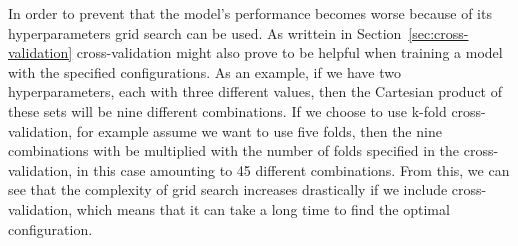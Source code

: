 In order to prevent that the model's performance becomes worse because of its hyperparameters grid search can be used. As writtein in Section~\ref{sec:cross-validation} cross-validation might also prove to be helpful when training a model with the specified configurations. As an example, if we have two hyperparameters, each with three different values, then the Cartesian product of these sets will be nine different combinations. If we choose to use k-fold cross-validation, for example assume we want to use five folds, then the nine combinations with be multiplied with the number of folds specified in the cross-validation, in this case amounting to 45 different combinations. From this, we can see that the complexity of grid search increases drastically if we include cross-validation, which means that it can take a long time to find the optimal configuration.






